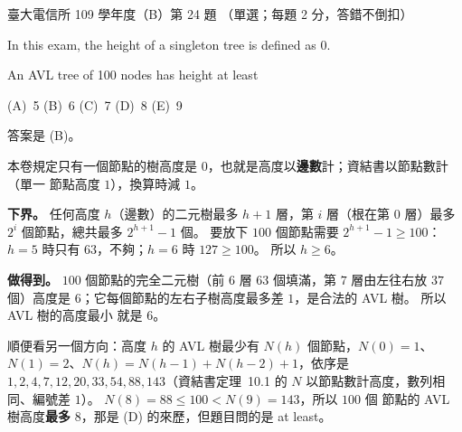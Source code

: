 \begin{pastexam}[label={px:ntu-109-comm-dsa-24}]{臺大電信所 109 學年度（B）第 24 題}
（單選；每題 2 分，答錯不倒扣）

In this exam, the height of a singleton tree is defined as 0.

An AVL tree of 100 nodes has height at least

(A)~5 \qquad (B)~6 \qquad (C)~7 \qquad (D)~8 \qquad (E)~9
\end{pastexam}

\begin{pastsoln}
答案是 (B)。

本卷規定只有一個節點的樹高度是 $0$，也就是高度以\textbf{邊數}計；資結書以節點數計（單一
節點高度 $1$），換算時減 $1$。

\textbf{下界。} 任何高度 $h$（邊數）的二元樹最多 $h + 1$ 層，第 $i$ 層（根在第 $0$ 層）最多
$2^i$ 個節點，總共最多 $2^{h+1} - 1$ 個。 要放下 $100$ 個節點需要 $2^{h+1} - 1 \ge 100$：
$h = 5$ 時只有 $63$，不夠；$h = 6$ 時 $127 \ge 100$。 所以 $h \ge 6$。

\textbf{做得到。} $100$ 個節點的完全二元樹（前 $6$ 層 $63$ 個填滿，第 $7$ 層由左往右放 $37$
個）高度是 $6$；它每個節點的左右子樹高度最多差 $1$，是合法的 AVL 樹。 所以 AVL 樹的高度最小
就是 $6$。

順便看另一個方向：高度 $h$ 的 AVL 樹最少有 $N(h)$ 個節點，$N(0) = 1$、$N(1) = 2$、$N(h) =
N(h - 1) + N(h - 2) + 1$，依序是 $1, 2, 4, 7, 12, 20, 33, 54, 88, 143$（資結書定理~10.1 的
$N$ 以節點數計高度，數列相同、編號差 $1$）。 $N(8) = 88 \le 100 < N(9) = 143$，所以 $100$ 個
節點的 AVL 樹高度\textbf{最多} $8$，那是 (D) 的來歷，但題目問的是 at least。
\end{pastsoln}
